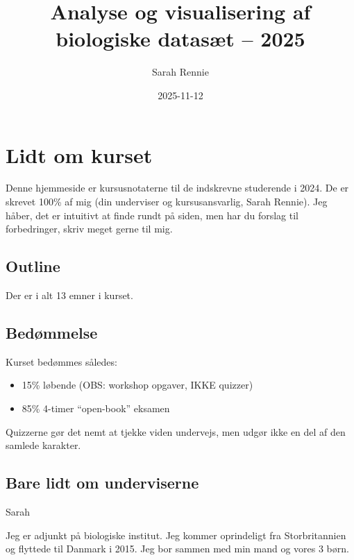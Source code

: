 \documentclass[
]{book}
\title{Analyse og visualisering af biologiske datasæt -- 2025}
\author{Sarah Rennie}
\date{2025-11-12}
\providecommand{\tightlist}{%
  \setlength{\itemsep}{0pt}\setlength{\parskip}{0pt}}
\begin{document}
\maketitle

{
\setcounter{tocdepth}{1}
\tableofcontents
}
\chapter*{Lidt om kurset}\label{lidt-om-kurset}

Denne hjemmeside er kursusnotaterne til de indskrevne studerende i 2024. De er skrevet 100\% af mig (din underviser og kursusansvarlig, Sarah Rennie). Jeg håber, det er intuitivt at finde rundt på siden, men har du forslag til forbedringer, skriv meget gerne til mig.

\section*{Outline}\label{outline}

Der er i alt 13 emner i kurset.

\section*{Bedømmelse}\label{beduxf8mmelse}

Kurset bedømmes således:

\begin{itemize}
\tightlist
\item
  15\% løbende (OBS: workshop opgaver, IKKE quizzer)
\item
  85\% 4-timer ``open-book'' eksamen
\end{itemize}

Quizzerne gør det nemt at tjekke viden undervejs, men udgør ikke en del af den samlede karakter.

\section*{Bare lidt om underviserne}\label{bare-lidt-om-underviserne}

Sarah

Jeg er adjunkt på biologiske institut. Jeg kommer oprindeligt fra Storbritannien og flyttede til Danmark i 2015. Jeg bor sammen med min mand og vores 3 børn.
\end{document}
